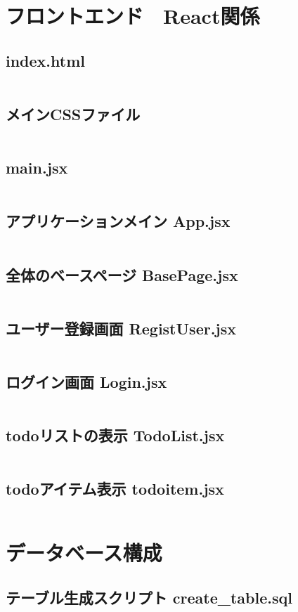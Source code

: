 \documentclass[paper=a4paper, fontsize=10pt, head_space=10mm, foot_space=17mm, gutter=17mm, line_length=185mm, twoside]{jlreq}
\begin{document}
\section {フロントエンド　React関係}
\subsection {index.html}
\inputminted[linenos, breaklines]{html}{index.html}
\clearpage

\subsection {メインCSSファイル}
\inputminted[linenos, breaklines]{css}{src-react/App.css}
\clearpage

\subsection {main.jsx}
\inputminted[linenos, breaklines]{jsx}{src-react/main.jsx}
\clearpage

\subsection {アプリケーションメイン App.jsx}
\inputminted[linenos, breaklines]{jsx}{src-react/App.jsx}
\clearpage

\subsection {全体のベースページ BasePage.jsx}
\inputminted[linenos, breaklines]{jsx}{src-react/BasePage.jsx}
\clearpage

\subsection {ユーザー登録画面 RegistUser.jsx}
\inputminted[linenos, breaklines]{jsx}{src-react/RegistUser.jsx}
\clearpage

\subsection {ログイン画面 Login.jsx}
\inputminted[linenos, breaklines]{jsx}{src-react/Login.jsx}
\clearpage

\subsection {todoリストの表示 TodoList.jsx}
\inputminted[linenos, breaklines]{jsx}{src-react/TodoList.jsx}
\clearpage

\subsection {todoアイテム表示 todoitem.jsx}
\inputminted[linenos, breaklines]{jsx}{src-react/todoitem.jsx}
\clearpage


\section{データベース構成}
\subsection{テーブル生成スクリプト create\_table.sql}
\inputminted[linenos, breaklines]{sql}{mariadb/create_table.sql}
\clearpage
\end{document}

